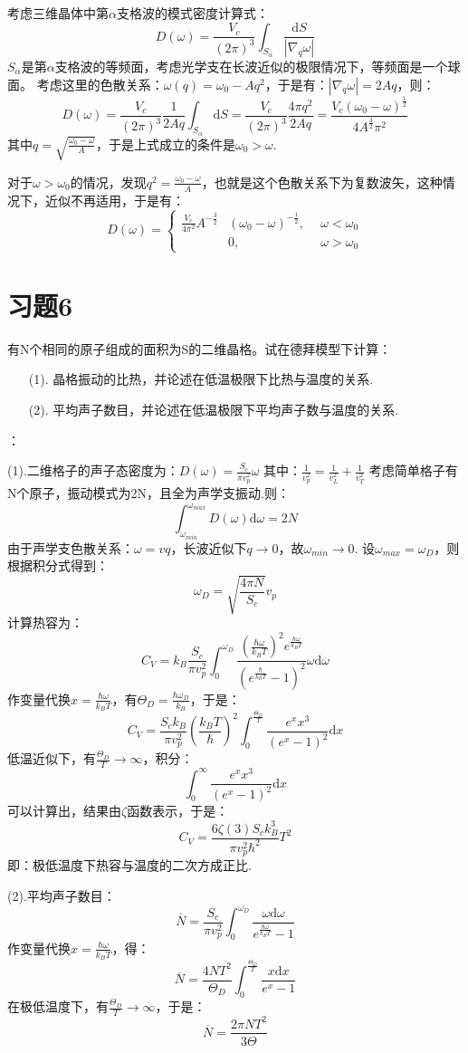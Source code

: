 \documentclass[UTF8]{ctexart}
\newcommand{\dd}{\mathrm{d}}
\begin{document}
考虑三维晶体中第$\alpha$支格波的模式密度计算式：
$$D(\omega)=\frac{V_c}{(2\pi)^3}\int_{S_{\alpha}}{\frac{\dd S}{|\nabla_q \omega|}}$$
$S_{\alpha}$是第$\alpha$支格波的等频面，考虑光学支在长波近似的极限情况下，等频面是一个球面。
考虑这里的色散关系：$\omega(q)=\omega_0-Aq^2$，于是有：$|\nabla_q\omega|=2Aq$，则：
$$D(\omega)=\frac{V_c}{(2\pi)^3}\frac{1}{2Aq}\int_{S_{\alpha}}{\dd S}=\frac{V_c}{(2\pi)^3}\frac{4\pi q^2}{2Aq}=\frac{V_c(\omega_0-\omega)^{\frac{1}{2}}}{4A^{\frac{3}{2}}\pi^2}$$
其中$q=\sqrt{\frac{\omega_0-\omega}{A}}$，于是上式成立的条件是$\omega_0>\omega$.

对于$\omega>\omega_0$的情况，发现$q^2=\frac{\omega_0-\omega}{A}$，也就是这个色散关系下为复数波矢，这种情况下，近似不再适用，于是有：
\begin{equation*}
    D(\omega)=\left\{\begin{aligned}
        \frac{V_c}{4\pi^2}A^{-\frac{3}{2}}&(\omega_0-\omega)^{-\frac{1}{2}},\ \ &\omega<\omega_0\\
        &0,&\omega>\omega_0
    \end{aligned}\right.
\end{equation*}
\vskip 0.5cm
\section*{习题6}
有N个相同的原子组成的面积为S的二维晶格。试在德拜模型下计算：
\begin{itemize}
    \item[(1).]晶格振动的比热，并论述在低温极限下比热与温度的关系.
    \item[(2).]平均声子数目，并论述在低温极限下平均声子数与温度的关系.  
\end{itemize}
\vskip 0.3cm
：

\noindent (1).二维格子的声子态密度为：$D(\omega)=\frac{S_c}{\pi v_p^2}\omega$
其中：$\frac{1}{v_p^2}=\frac{1}{v_L^2}+\frac{1}{v_T^2}$
考虑简单格子有N个原子，振动模式为2N，且全为声学支振动.则：
$$\int_{\omega_{min}}^{\omega_{max}}{D(\omega)\dd\omega}=2N$$
由于声学支色散关系：$\omega=vq$，长波近似下$q\to 0$，故$\omega_{min}\to 0$.
设$\omega_{max}=\omega_D$，则根据积分式得到：
$$\omega_D=\sqrt{\frac{4\pi N}{S_c}}v_p$$
计算热容为：
$$C_V=k_B\frac{S_c}{\pi v_p^2}\int_{0}^{\omega_D}{\frac{\left(\frac{\hbar\omega}{k_BT}\right)^2 e^{\frac{\hbar\omega}{k_BT}}}{\left(e^{\frac{\hbar}{k_BT}}-1\right)^2}\omega\dd\omega}$$
作变量代换$x=\frac{\hbar\omega}{k_BT}$，有$\Theta_D=\frac{\hbar\omega_D}{k_B}$，于是：
$$C_V=\frac{S_ck_B}{\pi v_p^2}\left(\frac{k_BT}{\hbar}\right)^2\int_{0}^{\frac{\Theta_D}{T}}{\frac{e^xx^3}{(e^x-1)^2}\dd x}$$
低温近似下，有$\frac{\Theta_D}{T}\to\infty$，积分：
$$\int_{0}^{\infty}{\frac{e^xx^3}{(e^x-1)^2}\dd x}$$
可以计算出，结果由$\zeta$函数表示，于是：
$$C_V=\frac{6\zeta(3)S_ck_B^3}{\pi v_p^2\hbar^2}T^2$$
即：极低温度下热容与温度的二次方成正比.

\noindent (2).平均声子数目：
$$\overline{N}=\frac{S_c}{\pi v_p^2}\int_{0}^{\omega_D}{\frac{\omega\dd\omega}{e^{\frac{\hbar\omega}{k_BT}}-1}}$$
作变量代换$x=\frac{\hbar\omega}{k_BT}$，得：
$$\overline{N}=\frac{4NT^2}{\Theta_D}\int_{0}^{\frac{\Theta_D}{T}}{\frac{x\dd x}{e^x-1}}$$
在极低温度下，有$\frac{\Theta_D}{T}\to\infty$，于是：
$$\overline{N}=\frac{2\pi NT^2}{3\Theta}$$
\end{document}

